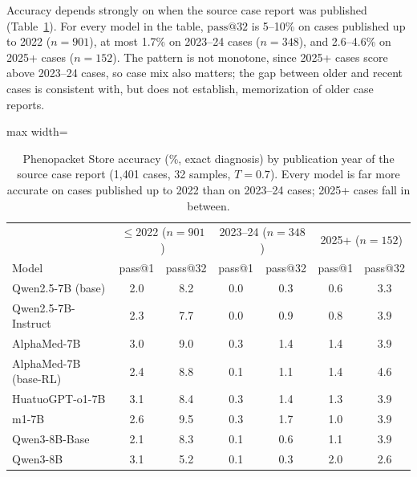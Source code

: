 \documentclass[11pt]{article}
\makeatletter
\newcommand{\passk}[1]{\mathrm{pass@}#1}
\makeatother
\begin{document}
Accuracy depends strongly on when the source case report was published (Table~\ref{tab:era}). For every model in the table, $\passk{32}$ is 5--10\% on cases published up to 2022 ($n{=}901$), at most 1.7\% on 2023--24 cases ($n{=}348$), and 2.6--4.6\% on 2025+ cases ($n{=}152$). The pattern is not monotone, since 2025+ cases score above 2023--24 cases, so case mix also matters; the gap between older and recent cases is consistent with, but does not establish, memorization of older case reports.

\begin{table}[t]
\centering\small
\begin{adjustbox}{max width=\linewidth}
\begin{tabular}{lcccccc}
\toprule
 & \multicolumn{2}{c}{$\le$2022 ($n{=}901$)} & \multicolumn{2}{c}{2023--24 ($n{=}348$)} & \multicolumn{2}{c}{2025+ ($n{=}152$)} \\
Model & pass@1 & pass@32 & pass@1 & pass@32 & pass@1 & pass@32 \\
\midrule
Qwen2.5-7B (base) & 2.0 & 8.2 & 0.0 & 0.3 & 0.6 & 3.3 \\
Qwen2.5-7B-Instruct & 2.3 & 7.7 & 0.0 & 0.9 & 0.8 & 3.9 \\
AlphaMed-7B & 3.0 & 9.0 & 0.3 & 1.4 & 1.4 & 3.9 \\
AlphaMed-7B (base-RL) & 2.4 & 8.8 & 0.1 & 1.1 & 1.4 & 4.6 \\
HuatuoGPT-o1-7B & 3.1 & 8.4 & 0.3 & 1.4 & 1.3 & 3.9 \\
m1-7B & 2.6 & 9.5 & 0.3 & 1.7 & 1.0 & 3.9 \\
Qwen3-8B-Base & 2.1 & 8.3 & 0.1 & 0.6 & 1.1 & 3.9 \\
Qwen3-8B & 3.1 & 5.2 & 0.1 & 0.3 & 2.0 & 2.6 \\
\bottomrule
\end{tabular}
\end{adjustbox}
\caption{Phenopacket Store accuracy (\%, exact diagnosis) by publication year of the source case report (1,401 cases, 32 samples, $T{=}0.7$). Every model is far more accurate on cases published up to 2022 than on 2023--24 cases; 2025+ cases fall in between.}
\label{tab:era}
\end{table}
\end{document}
